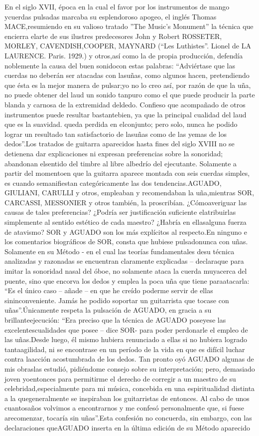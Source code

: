 \documentclass[
10pt, %
a4paper, %
oneside, %
headinclude,footinclude, %
BCOR5mm, %
]{scrartcl}
\begin{document}
{En el siglo XVII, época en la cual el favor por los instrumentos de mango ycuerdas pulsadas marcaba su esplendoroso apogeo, el inglés Thomas MACE,resumiendo en su valioso tratado ”The Music's Monument” la técnica que encierra elarte de sus ilustres predecesores John y Robert ROSSETER, MORLEY, CAVENDISH,COOPER, MAYNARD (“Les Luthistes”. Lionel de LA LAURENCE. Paris. 1929.) y otros,así como la de propia producción, defendía noblemente la causa del buen sonidocon estas palabras: “Adviértase que las cuerdas no deberán ser atacadas con lasuñas, como algunos hacen, pretendiendo que ésta es la mejor manera de pulsar;yo no lo creo así, por razón de que la uña, no puede obtener del laud un sonido tanpuro como el que puede producir la parte blanda y carnosa de la extremidad deldedo. Confieso que acompañado de otros instrumentos puede resultar bastantebien, ya que la principal cualidad del laud que es la suavidad. queda perdida en elconjunto; pero solo, nunca he podido lograr un resultado tan satisfactorio de lasuñas como de las yemas de los dedos”.Los tratados de guitarra aparecidos hasta fines del siglo XVIII no se detienena dar explicaciones ni expresan preferencias sobre la sonoridad; abandonan elsentido del timbre al libre albedrío del ejecutante. Solamente a partir del momentoen que la guitarra aparece montada con seis cuerdas simples, es cuando semanifiestan categóricamente las dos tendencias.AGUADO, GIULIANI, CARULLI y otros, empleaban y recomendaban la uña,mientras SOR, CARCASSI, MESSONIER y otros también, la proscribían. ¿Cómoaveriguar las causas de tales preferencias? ¿Podría ser justificación suficiente elatribuirlas simplemente al sentido estético de cada maestro? ¿Habría en ellasalguna fuerza de atavismo? SOR y AGUADO son los más explícitos al respecto.En ninguno e los comentarios biográficos de SOR, consta que hubiese pulsadonunca con uñas. Solamente en su Método - en el cual las teorías fundamentales desu técnica analizadas y razonadas se encuentran claramente explicadas – declaraque para imitar la sonoridad nasal del óboe, no solamente ataca la cuerda muyacerca del puente, sino que encorva los dedos y emplea la poca uña que tiene paraatacarla: “Es el único caso – añade – en que he creído poderme servir de ellas sininconveniente. Jamás he podido soportar un guitarrista que tocase con uñas”.Únicamente respeta la pulsación de AGUADO, en gracia a su brillanteejecución: “Era preciso que la técnica de AGUADO poseyese las excelentescualidades que posee – dice SOR- para poder perdonarle el empleo de las uñas.Desde luego, él mismo hubiera renunciado a ellas si no hubiera logrado tantaagilidad, ni se encontrase en un período de la vida en que es difícil luchar contra laacción acostumbrada de los dedos. Tan pronto oyó AGUADO algunas de mis obraslas estudió, pidiéndome consejo sobre su interpretación; pero, demasiado joven yoentonces para permitirme el derecho de corregir a un maestro de su celebridad,especialmente para mi música, concebida en una espiritualidad distinta a la quegeneralmente se inspiraban los guitarristas de entonces. Al cabo de unos cuantosaños volvimos a encontrarnos y me confesó personalmente que, si fuese arecomenzar, tocaría sin uñas”.Esta confesión no concuerda, sin embargo, con las declaraciones queAGUADO inserta en la última edición de su Método aparecido }
\end{document}
